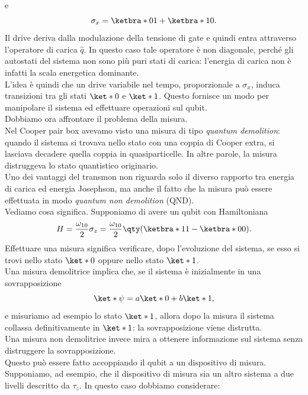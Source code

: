 e
\begin{equation*}
    \sigma_x
    =
    \ketbra*{0}{1}
    +
    \ketbra*{1}{0}.
\end{equation*}
Il drive deriva dalla modulazione della tensione di gate e quindi entra attraverso l'operatore di carica $\hat{q}$. In questo caso tale operatore è non diagonale, perché gli autostati del sistema non sono più puri stati di carica: l'energia di carica non è infatti la scala energetica dominante.\\
L'idea è quindi che un drive variabile nel tempo, proporzionale a $\sigma_x$, induca transizioni tra gli stati $\ket*{0}$ e $\ket*{1}$. Questo fornisce un modo per manipolare il sistema ed effettuare operazioni sul qubit.\\
Dobbiamo ora affrontare il problema della misura.\\
Nel Cooper pair box avevamo visto una misura di tipo \emph{quantum demolition}: quando il sistema si trovava nello stato con una coppia di Cooper extra, si lasciava decadere quella coppia in quasiparticelle. In altre parole, la misura distruggeva lo stato quantistico originario.\\
Uno dei vantaggi del transmon non riguarda solo il diverso rapporto tra energia di carica ed energia Josephson, ma anche il fatto che la misura può essere effettuata in modo \emph{quantum non demolition} (QND).\\
Vediamo cosa significa. Supponiamo di avere un qubit con Hamiltoniana
\begin{equation*}
    H
    =
    \frac{\omega_{10}}{2}\sigma_z
    =
    \frac{\omega_{10}}{2}
    \qty(
        \ketbra*{1}{1}
        -
        \ketbra*{0}{0}
    ).
\end{equation*}
Effettuare una misura significa verificare, dopo l'evoluzione del sistema, se esso si trovi nello stato $\ket*{0}$ oppure nello stato $\ket*{1}$.\\
Una misura demolitrice implica che, se il sistema è inizialmente in una sovrapposizione
\begin{equation*}
    \ket*{\psi}
    =
    a\ket*{0}
    +
    b\ket*{1},
\end{equation*}
e misuriamo ad esempio lo stato $\ket*{1}$, allora dopo la misura il sistema collassa definitivamente in $\ket*{1}$: la sovrapposizione viene distrutta.\\
Una misura non demolitrice invece mira a ottenere informazione sul sistema senza distruggere la sovrapposizione.\\
Questo può essere fatto accoppiando il qubit a un dispositivo di misura. Supponiamo, ad esempio, che il dispositivo di misura sia un altro sistema a due livelli descritto da $\tau_z$. In questo caso dobbiamo considerare:
